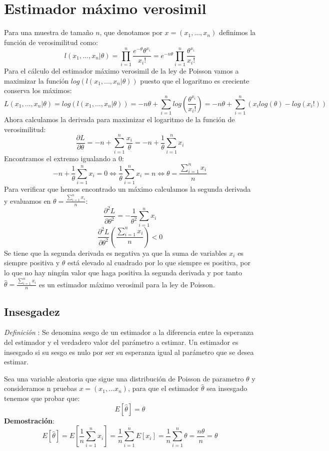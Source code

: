 \documentclass[a4paper, 10pt]{article} %
\newcounter{def}
\begin{document}
\section{Estimador máximo verosimil}
Para una muestra de tamaño $n$, que denotamos por $x=(x_1,...,x_n)$ definimos la función de verosimilitud como:
$$l(x_1,...,x_n|\theta)=\prod_{i=1}^{n} \frac{e^{-\theta}\theta^{x_i}}{x_i!}=e^{-n\theta}\prod_{i=1}^{n} \frac{\theta^{x_i}}{x_i!}$$
Para el cálculo del estimador máximo verosimil de la ley de Poisson vamos a maximizar la función $log(l(x_1,...,x_n|\theta))$ puesto que el logaritmo es creciente conserva los máximos:
$$L(x_1,...,x_n|\theta)=log(l(x_1,...,x_n|\theta))=-n\theta + \sum_{i=1}^{n}log(\frac{\theta^{x_i}}{x_i!})=-n\theta+ \sum_{i=1}^{n}(x_i log(\theta)-log(x_i!))$$
Ahora calculamos la derivada para maximizar el logaritmo de la función de verosimilitud:
$$\frac{\partial L}{\partial \theta}=-n+\sum_{i=1}^{n}\frac{x_i}{\theta}=-n+\frac{1}{\theta}\sum_{i=1}^{n}x_i$$
Encontramos el extremo igualando a 0:
$$-n+\frac{1}{\theta}\sum_{i=1}^{n}x_i=0 \Leftrightarrow \frac{1}{\theta}\sum_{i=1}^{n}x_i=n \Leftrightarrow \theta =\frac{\sum_{i=1}^{n}x_i}{n}$$
Para verificar que hemos encontrado un máximo calculamos la segunda derivada y evaluamos en $\theta =\frac{\sum_{i=1}^{n}x_i}{n}$:
$$\frac{\partial^2 L}{\partial \theta^2}=-\frac{1}{\theta^2}\sum_{i=1}^{n}x_i$$
$$\frac{\partial^2 L}{\partial \theta^2}(\frac{\sum_{i=1}^{n}x_i}{n})<0$$
Se tiene que la segunda derivada es negativa ya que la suma de variables $x_i$ es siempre positiva y $\theta$ está elevado al cuadrado por lo que siempre es positiva, por lo que no hay ningún valor que haga positiva la segunda derivada y por tanto $\hat{\theta}=\frac{\sum_{i=1}^{n}x_i}{n}$ es un estimador máximo verosimil para la ley de Poisson.
\subsection{Insesgadez}
\addtocounter{def}{1}
\emph{Definición }: Se denomina sesgo de un estimador a la diferencia entre la esperanza del estimador y el verdadero valor del parámetro a estimar. Un estimador es insesgado si su sesgo es nulo por ser su esperanza igual al parámetro que se desea estimar.

Sea una variable aleatoria que sigue una distribución de Poisson de parametro $\theta$ y consideramos n pruebas $x=(x_1,...x_n)$, para que el estimador $\hat{\theta}$ sea insesgado tenemos que probar que:
$$E[\hat{\theta}]=\theta$$
\textbf{Demostración}:
$$E[\hat{\theta}]=E[\frac{1}{n}\sum_{i=1}^{n}x_i]=\frac{1}{n}\sum_{i=1}^{n}E[x_i]=\frac{1}{n}\sum_{i=1}^{n}\theta=\frac{n\theta}{n}=\theta$$
\end{document}
